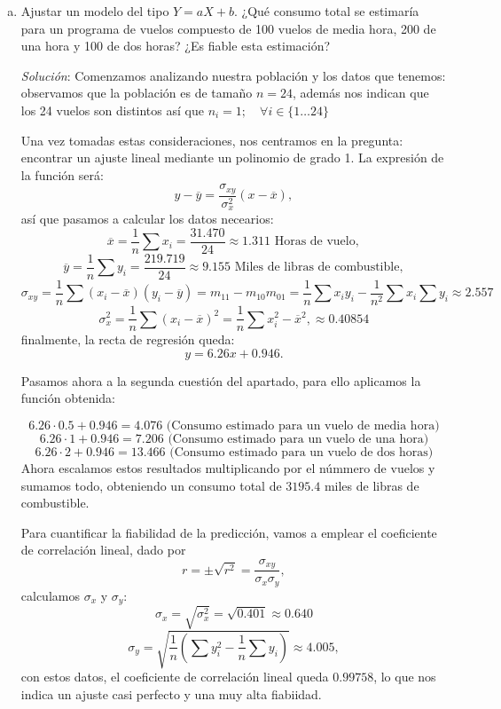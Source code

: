 \documentclass[10pt,a4paper]{article}
\begin{document}
\begin{enumerate}
            \begin{enumerate}[a)]
                \item Ajustar un modelo del tipo \(Y=aX+b\). ¿Qué consumo total se estimaría para un programa de vuelos compuesto de 100 vuelos de media hora, 200 de una hora y 100 de dos horas? ¿Es fiable esta estimación?


                    \emph{Solución}: Comenzamos analizando nuestra población y los datos que tenemos: observamos que la población es de tamaño \(n=24\), además nos indican que los 24 vuelos son distintos así que \(n_i = 1; \quad \forall i \in \{1 \dots 24\}\) 


                    Una vez tomadas estas consideraciones, nos centramos en la pregunta: encontrar un ajuste lineal mediante un polinomio de grado 1. La expresión de la función será: \[y - \overline{y}=\frac{\sigma_{xy}}{\sigma_x^2}\left(x-\overline{x}\right),\] así que pasamos a calcular los datos necearios:\[\overline{x}=\frac{1}{n}\sum x_i = \frac{31.470}{24}\approx1.311\text{ Horas de vuelo},\]\[\overline{y}=\frac{1}{n}\sum y_i=\frac{219.719}{24}\approx 9.155\text{ Miles de libras de combustible},\]\[\sigma_{xy}=\frac{1}{n}\sum(x_i-\overline{x})(y_i-\overline{y})=m_{11}-m_{10}m_{01}=\frac{1}{n}\sum x_iy_i-\frac{1}{n^2}\sum x_i\sum y_i\approx 2.557\]\[\sigma_x^2=\frac{1}{n}\sum(x_i-\overline{x})^2=\frac{1}{n}\sum x_i^2 - \overline{x}^2,\approx 0.40854\] finalmente, la recta de regresión queda: \[y=6.26x+0.946.\]

                    Pasamos ahora a la segunda cuestión del apartado, para ello aplicamos la función obtenida:


                    \[ 6.26\cdot 0.5+0.946 = 4.076 \text{ (Consumo estimado para un vuelo de media hora)}\]\[6.26 \cdot 1 + 0.946 = 7.206 \text{ (Consumo estimado para un vuelo de una hora)}\]\[6.26 \cdot 2 + 0.946 = 13.466 \text{ (Consumo estimado para un vuelo de dos horas)}\] Ahora escalamos estos resultados multiplicando por el númmero de vuelos y sumamos todo, obteniendo un consumo total de \(3195.4\) miles de libras de combustible.
                    
                    Para cuantificar la fiabilidad de la predicción, vamos a emplear el coeficiente de correlación lineal, dado por \[r=\pm\sqrt{r^2}=\frac{\sigma_{xy}}{\sigma_x\sigma_y},\] calculamos \(\sigma_x\) y \(\sigma_y\): \[\sigma_x=\sqrt{\sigma_x^2}=\sqrt{0.401}\approx0.640\]\[\sigma_y=\sqrt{\frac{1}{n}\left(\sum y_i^2-\frac{1}{n}\sum y_i\right)}\approx 4.005,\] con estos datos, el coeficiente de correlación lineal queda \(0.99758\), lo que nos indica un ajuste casi perfecto y una muy alta fiabiidad.
                

\end{enumerate}
\end{enumerate}
\end{document}
